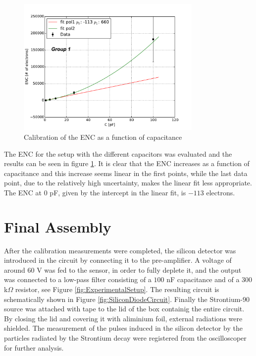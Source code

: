 \documentclass[12pt]{article}
\begin{document}
\begin{figure}[H]
  \centering
  \includegraphics[width=0.8\textwidth]{./graphics/calibrationENC_diode}
  \caption{Calibration of the ENC as a function of capacitance} %
  \label{fig:ENC_vs_Capacitance}
\end{figure}

The ENC for the setup with the different capacitors was evaluated and the results can be seen in figure \ref{fig:ENC_vs_Capacitance}. It is clear that the ENC increases as a function of capacitance and this increase seems linear in the first points, while the last data point, due to the relatively high uncertainty, makes the linear fit less appropriate. The ENC at $0$ pF, given by the intercept in the linear fit, is $-113$ electrons.


\section{Final Assembly}
After the calibration measurements were completed, the silicon detector was introduced in the circuit by connecting it to the pre-amplifier. A voltage of around $60$ V was fed to the sensor, in order to fully deplete it, and the output was connected to a low-pass filter consisting of a $100$ nF capacitance and of a $300$ k$\Omega$ resistor, see Figure \ref{fig:ExperimentalSetup}. The resulting circuit is schematically shown in Figure \ref{fig:SiliconDiodeCircuit}.
Finally the Strontium-90 source was attached with tape to the lid of the box containig the entire circuit. By closing the lid and covering it with aliminium foil, external radiations were shielded. The measurement of the pulses induced in the silicon detector by the particles radiated by the Strontium decay were registered from the oscilloscoper for further analysis.
\end{document}
